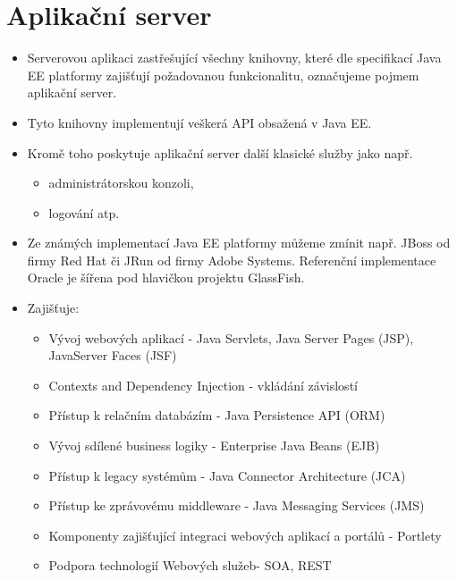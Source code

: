 \documentclass{szzclass}
\begin{document}
\tableofcontents
\newpage

\section{Aplikační server}
\begin{itemize}
\item Serverovou aplikaci zastřešující všechny knihovny, které dle specifikací Java EE platformy zajišťují požadovanou funkcionalitu, označujeme pojmem aplikační server. 
\item Tyto knihovny implementují veškerá API obsažená v Java EE. 
\item Kromě toho poskytuje aplikační server další klasické služby jako např. 
  \begin{itemize}
    \item administrátorskou konzoli, 
    \item logování atp. 
  \end{itemize}
\item Ze známých implementací Java EE platformy můžeme zmínit např. JBoss od firmy Red Hat či JRun od firmy Adobe Systems. Referenční implementace Oracle je šířena pod hlavičkou projektu GlassFish.
\item Zajišťuje:
  \begin{itemize}
    \item Vývoj webových aplikací - Java Servlets, Java Server Pages (JSP), JavaServer Faces (JSF)
    \item Contexts and Dependency Injection - vkládání závislostí
    \item Přístup k relačním databázím - Java Persistence API (ORM)
    \item Vývoj sdílené business logiky - Enterprise Java Beans (EJB)
    \item Přístup k legacy systémům - Java Connector Architecture (JCA)
    \item Přístup ke zprávovému middleware - Java Messaging Services (JMS)
    \item Komponenty zajišťující integraci webových aplikací a portálů - Portlety
    \item Podpora technologií Webových služeb- SOA, REST
  \end{itemize}
\end{itemize}
\end{document}
